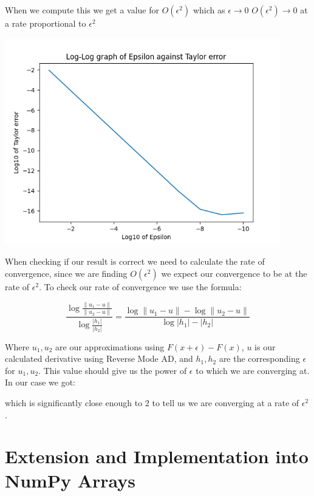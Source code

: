 \documentclass{article}
\begin{document}
When we compute this we get a value for $O(\epsilon^2)$ which as $\epsilon \to 0$ $O(\epsilon^2) \to 0$ at a rate proportional to $\epsilon^2$

\begin{center}
    \includegraphics[width=12cm]{images/Taylor_error_1.png}
\end{center}

When checking if our result is correct we need to calculate the rate of convergence, since we are finding $O(\epsilon^2)$ we expect our convergence to be at the rate of $\epsilon^2$. To check our rate of convergence we use the formula:

\begin{equation}
    \frac{\log{\frac{\|u_1 - u\|}{\|u_2 - u\|}}}{\log{\frac{|h_1|}{|h_2|}}} = \frac{\log\|u_1 - u\| - \log\|u_2 - u\|}{\log|h_1| - |h_2|}
\end{equation}

Where $u_1, u_2$ are our approximations using $F(x + \epsilon) - F(x)$, $u$ is our calculated derivative using Reverse Mode AD, and $h_1, h_2$ are the corresponding $\epsilon$ for $u_1, u_2$. This value should give us the power of $\epsilon$ to which we are converging at. In our case we got:

\beigin{}


which is significantly close enough to 2 to tell us we are converging at a rate of $\epsilon^2$.





\section{Extension and Implementation into NumPy Arrays}
\end{document}
